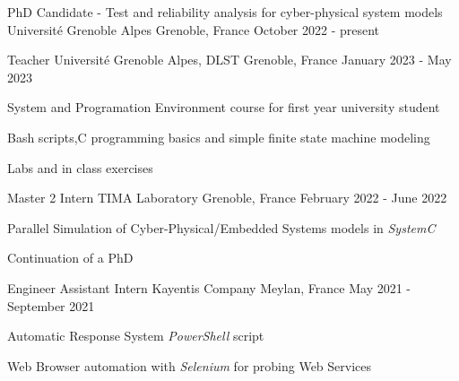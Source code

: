 

\begin{cventries}

	\cventry
	{PhD Candidate - Test and reliability analysis for cyber-physical system models} %
	{Université Grenoble Alpes} %
	{Grenoble, France} %
	{October 2022 - present} %
	{
	}

	\cventry
	{Teacher} %
	{Université Grenoble Alpes, DLST} %
	{Grenoble, France} %
	{January 2023 - May 2023} %
	{
		\begin{cvitems} %
		\item{System and Programation Environment course for first year university student}
		\item{Bash scripts,C programming basics and simple finite state machine modeling}
		\item{Labs and in class exercises}
		\end{cvitems}
	}

	\cventry
	{Master 2 Intern} %
	{TIMA Laboratory} %
	{Grenoble, France} %
	{February 2022 - June 2022} %
	{
		\begin{cvitems} %
		\item{Parallel Simulation of Cyber-Physical/Embedded Systems models in \emph{SystemC}}
		\item{Continuation of a PhD}
		\end{cvitems}
	}

	\cventry
	{Engineer Assistant Intern} %
	{Kayentis Company} %
	{Meylan, France} %
	{May 2021 - September 2021} %
	{
		\begin{cvitems} %
		\item {Automatic Response System \emph{PowerShell} script}
		\item {Web Browser automation with \emph{Selenium} for probing Web Services}
		\end{cvitems}
	}


\end{cventries}
